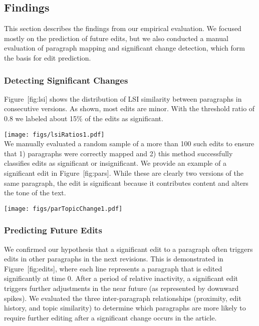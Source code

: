 \subsection{Findings}\label{findings}

This section describes the findings from our empirical evaluation. We
focused mostly on the prediction of future edits, but we also conducted
a manual evaluation of paragraph mapping and significant change
detection, which form the basis for edit prediction.

\subsubsection{Detecting Significant
Changes}\label{detecting-significant-changes}

Figure~{[}fig:lsi{]} shows the distribution of LSI similarity between
paragraphs in consecutive versions. As shown, most edits are minor. With
the threshold ratio of 0.8 we labeled about 15\% of the edits as
significant.

\texttt{[image: figs/lsiRatios1.pdf]}\\

We manually evaluated a random sample of a more than 100 such edits to
ensure that 1) paragraphs were correctly mapped and 2) this method
successfully classifies edits as significant or insignificant. We
provide an example of a significant edit in Figure~{[}fig:pars{]}. While
these are clearly two versions of the same paragraph, the edit is
significant because it contributes content and alters the tone of the
text.

\texttt{[image: figs/parTopicChange1.pdf]}\\

\subsubsection{Predicting Future Edits}\label{predicting-future-edits-1}

We confirmed our hypothesis that a significant edit to a paragraph often
triggers edits in other paragraphs in the next revisions. This is
demonstrated in Figure~{[}fig:edits{]}, where each line represents a
paragraph that is edited significantly at time 0. After a period of
relative inactivity, a significant edit triggers further adjustments in
the near future (as represented by downward spikes). We evaluated the
three inter-paragraph relationships (proximity, edit history, and topic
similarity) to determine which paragraphs are more likely to require
further editing after a significant change occurs in the article.


